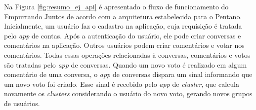 Na Figura \ref{fig:resumo_ej_api} é apresentado o fluxo de funcionamento do Empurrando Juntos de acordo com a arquitetura
estabelecida para o Pentano. Inicialmente, um usuário faz o cadastro na aplicação, cuja requisição é tratada pelo \textit{app} de contas.
Após a autenticação do usuário, ele pode criar conversas e comentários na aplicação. Outros usuários podem criar comentários e votar
nos comentários. Todas essas operações relacionadas à conversas, comentários e votos são tratadas pelo \textit{app} de conversas.
Quando um novo voto é realizado em algum comentário de uma conversa, o \textit{app} de conversas dispara um sinal informando que um novo
voto foi criado. Esse sinal é recebido pelo \textit{app} de \textit{cluster}, que calcula novamente os \textit{clusters} considerando
o usuário do novo voto, gerando novos grupos de usuários.










